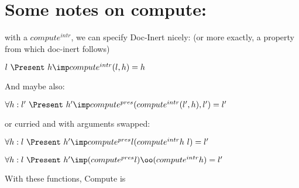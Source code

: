 %
%
%
%


\section{Some notes on compute:}

with a $compute^{intr}$, we can specify {\sc Doc-Inert} nicely: (or more exactly, a property from which doc-inert follows)

$l~\Present~h \imp compute^{intr} (l,h) = h$

And maybe also:

$\forall h : l'~\Present~h' \imp compute^{pres}( compute^{intr} (l',h), l' ) = l'$ 

or curried and with arguments swapped:

$\forall h : l~\Present~h' \imp compute^{pres} l (compute^{intr} h~l) = l'$ 
 
$\forall h : l~\Present~h' \imp (compute^{pres} l) \oo (compute^{intr} h) = l'$ 

With these functions, {\sc Compute} is



